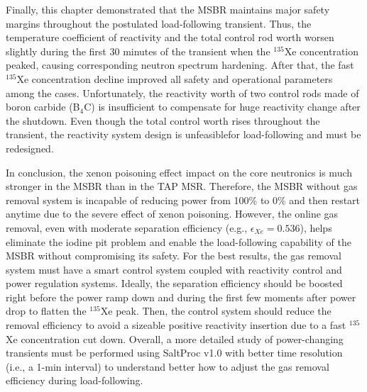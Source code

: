 Finally, this chapter demonstrated that the \gls{MSBR} maintains major safety 
margins throughout the postulated load-following transient. Thus, the 
temperature coefficient of reactivity and the total control rod worth worsen 
slightly during the first 30 minutes of the transient when the $^{135}$Xe 
concentration peaked, causing corresponding neutron spectrum hardening. After 
that, the fast $^{135}$Xe concentration decline improved all safety and 
operational parameters among the cases. Unfortunately, the reactivity worth of 
two control rods made of boron carbide (B$_4$C) is insufficient to compensate 
for huge reactivity change after the shutdown. Even though the total control 
worth rises throughout the transient, the reactivity system design is 
unfeasiblefor load-following and must be redesigned. 

In conclusion, the xenon poisoning effect impact on the core neutronics 
is much stronger in the \gls{MSBR} than in the \gls{TAP} \gls{MSR}. Therefore, 
the \gls{MSBR} without 
gas removal system is incapable of reducing power from 100\% to 0\% and then 
restart anytime due to the severe effect of xenon poisoning. However, the 
online gas removal, even with moderate separation efficiency (e.g., 
$\epsilon_{Xe}=0.536$), helps eliminate the iodine pit problem and enable the
load-following capability of the \gls{MSBR} without compromising its safety. 
For the best results, the gas removal system must have a smart control system 
coupled with reactivity control and power regulation systems. Ideally, the 
separation efficiency should be boosted right before the power ramp down and 
during the first few moments after power drop to flatten the $^{135}$Xe peak. 
Then, the control system should reduce the removal efficiency to avoid a
sizeable positive reactivity insertion due to a fast $^{135}$Xe concentration 
cut down. Overall, a more detailed study of power-changing transients must be 
performed using SaltProc v1.0 with better time resolution (i.e., a 1-min 
interval) to understand better how to adjust the gas removal efficiency during 
load-following.
